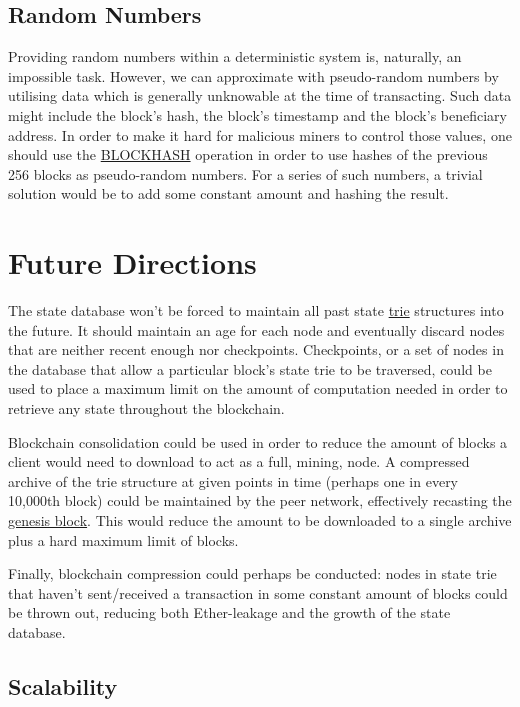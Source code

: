 \documentclass[9pt,oneside]{amsart}
\begin{document}
\begin{multicols}{2}
\subsection{Random Numbers}
Providing random numbers within a deterministic system is, naturally, an impossible task. However, we can approximate with pseudo-random numbers by utilising data which is generally unknowable at the time of transacting. Such data might include the block's hash, the block's timestamp and the block's beneficiary address. In order to make it hard for malicious miners to control those values, one should use the {\small \hyperlink{blockhash}{BLOCKHASH}} operation in order to use hashes of the previous 256 blocks as pseudo-random numbers. For a series of such numbers, a trivial solution would be to add some constant amount and hashing the result.

\section{Future Directions} \label{ch:future}

The state database won't be forced to maintain all past state \hyperlink{trie}{trie} structures into the future. It should maintain an age for each node and eventually discard nodes that are neither recent enough nor checkpoints. Checkpoints, or a set of nodes in the database that allow a particular block's state trie to be traversed, could be used to place a maximum limit on the amount of computation needed in order to retrieve any state throughout the blockchain.

Blockchain consolidation could be used in order to reduce the amount of blocks a client would need to download to act as a full, mining, node. A compressed archive of the trie structure at given points in time (perhaps one in every 10,000th block) could be maintained by the peer network, effectively recasting the \hyperlink{Genesis_Block}{genesis block}. This would reduce the amount to be downloaded to a single archive plus a hard maximum limit  of blocks.

Finally, blockchain compression could perhaps be conducted: nodes in state trie that haven't sent/received a transaction in some constant amount of blocks could be thrown out, reducing both Ether-leakage and the growth of the state database.

\subsection{Scalability}


\end{multicols}
\end{document}
